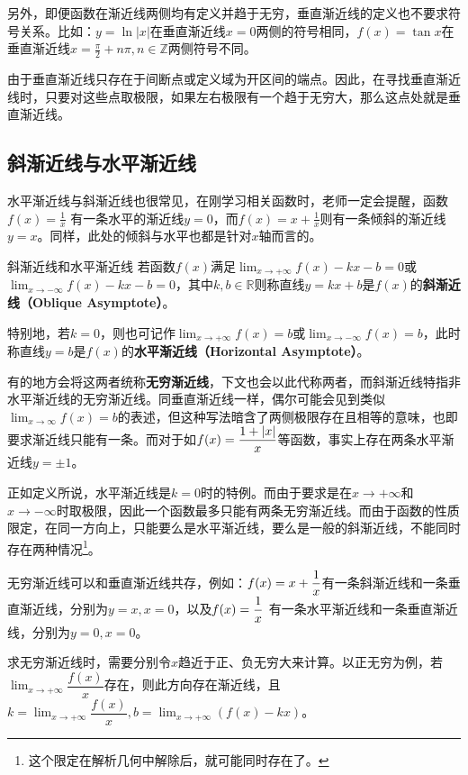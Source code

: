 另外，即便函数在渐近线两侧均有定义并趋于无穷，垂直渐近线的定义也不要求符号关系。比如：$y=\ln |x|$在垂直渐近线$x=0$两侧的符号相同，$f(x)=\tan x$在垂直渐近线$\displaystyle x = \frac{\pi}{2} + n\pi,n \in \mathbb{Z}$两侧符号不同。

由于垂直渐近线只存在于间断点或定义域为开区间的端点。因此，在寻找垂直渐近线时，只要对这些点取极限，如果左右极限有一个趋于无穷大，那么这点处就是垂直渐近线。

\subsection{斜渐近线与水平渐近线}

水平渐近线与斜渐近线也很常见，在刚学习相关函数时，老师一定会提醒，函数 $\displaystyle f(x) = \frac{1}{x}$ 有一条水平的渐近线$y = 0$，而$f(x) = x + \frac{1}{x}$则有一条倾斜的渐近线$y = x$。同样，此处的倾斜与水平也都是针对$x$轴而言的。

\begin{definition}{斜渐近线和水平渐近线}
若函数$f(x)$满足$\displaystyle \lim_{x\to +\infty}f(x)-kx-b=0$或$\displaystyle \lim_{x\to -\infty}f(x)-kx-b=0$，其中$k,b\in\mathbb{R}$则称直线$y=kx+b$是$f(x)$的\textbf{斜渐近线（Oblique Asymptote）}。

特别地，若$k=0$，则也可记作$\displaystyle \lim_{x\to +\infty}f(x)=b$或$\displaystyle \lim_{x\to -\infty}f(x)=b$，此时称直线$y=b$是$f(x)$的\textbf{水平渐近线（Horizontal Asymptote）}。
\end{definition}

有的地方会将这两者统称\textbf{无穷渐近线}，下文也会以此代称两者，而斜渐近线特指非水平渐近线的无穷渐近线。同垂直渐近线一样，偶尔可能会见到类似$\displaystyle \lim_{x\to \infty}f(x)=b$的表述，但这种写法暗含了两侧极限存在且相等的意味，也即要求渐近线只能有一条。而对于如$\displaystyle f(x)={1+|x|\over x}$等函数，事实上存在两条水平渐近线$y=\pm1$。

正如定义所说，水平渐近线是$k=0$时的特例。而由于要求是在$x\to +\infty$和$x\to -\infty$时取极限，因此一个函数最多只能有两条无穷渐近线。而由于函数的性质限定，在同一方向上，只能要么是水平渐近线，要么是一般的斜渐近线，不能同时存在两种情况\footnote{这个限定在解析几何中解除后，就可能同时存在了。}。

无穷渐近线可以和垂直渐近线共存，例如：$\displaystyle f(x)=x+{1\over x}$有一条斜渐近线和一条垂直渐近线，分别为$y=x,x=0$，以及$\displaystyle f(x)={1\over x}$ 有一条水平渐近线和一条垂直渐近线，分别为$y=0,x=0$。

求无穷渐近线时，需要分别令$x$趋近于正、负无穷大来计算。以正无穷为例，若$\displaystyle \lim_{x \to +\infty} \dfrac{f(x)}{x}$存在，则此方向存在渐近线，且$\displaystyle k=\lim_{x \to +\infty} \dfrac{f(x)}{x},b = \lim_{x \to +\infty}\left(f(x) - kx\right)$。


